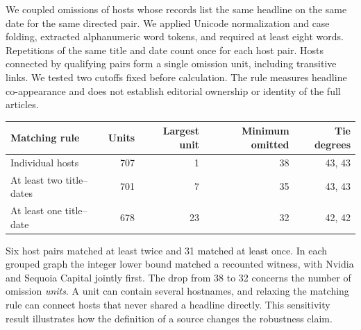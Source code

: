 We coupled omissions of hosts whose records list the same headline on the same date for the same directed pair. We applied Unicode normalization and case folding, extracted alphanumeric word tokens, and required at least eight words. Repetitions of the same title and date count once for each host pair. Hosts connected by qualifying pairs form a single omission unit, including transitive links. We tested two cutoffs fixed before calculation. The rule measures headline co-appearance and does not establish editorial ownership or identity of the full articles.

\begin{center}\small
\begin{tabular}{lrrrr}
\toprule
Matching rule & Units & Largest unit & Minimum omitted & Tie degrees\\
\midrule
Individual hosts & 707 & 1 & 38 & 43, 43\\
At least two title--dates & 701 & 7 & 35 & 43, 43\\
At least one title--date & 678 & 23 & 32 & 42, 42\\
\bottomrule
\end{tabular}
\end{center}
Six host pairs matched at least twice and 31 matched at least once. In each grouped graph the integer lower bound matched a recounted witness, with Nvidia and Sequoia Capital jointly first. The drop from 38 to 32 concerns the number of omission \emph{units}. A unit can contain several hostnames, and relaxing the matching rule can connect hosts that never shared a headline directly. This sensitivity result illustrates how the definition of a source changes the robustness claim.
